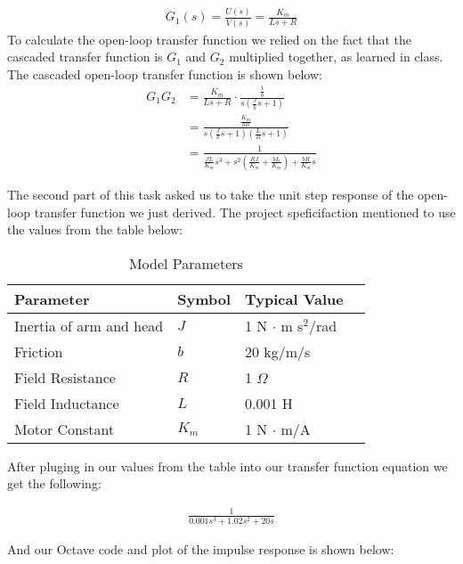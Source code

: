 \documentclass{article}
\begin{document}
	\begin{align*}
		G_1(s) = \frac{U(s)}{V(s)} = \frac{K_m}{Ls + R} 
	\end{align*}
	To calculate the open-loop transfer function we relied on the fact that
	the cascaded transfer function is $G_1$ and $G_2$ multiplied together, as
	learned in class. The cascaded open-loop transfer function is shown below:
	\begin{align*}
		G_1G_2 &= \frac{K_m}{Ls+R} \cdot \frac{\frac{1}{b}}{s(\frac{J}{b}s + 1)} \\
			   &= \frac{\frac{K_m}{bR}}{s\left(\frac{J}{b}s + 1\right)
			   \left(\frac{L}{R}s + 1\right)} \\
			   &= \frac{1}{\frac{JL}{K_m}s^3 + s^2\left( \frac{RJ}{K_m} + 
			   \frac{bL}{K_m} \right) + \frac{bR}{K_m}s}
	\end{align*}

	The second part of this task asked us to take the unit step response of the 
	open-loop transfer function we just derived. The project speficifaction 
	mentioned to use the values from the table below:\\

	\begin{table}[H]
	\begin{center}
    \begin{tabular}{ | l | l | l | p{5cm} |}
    \hline
    Parameter & Symbol & Typical Value \\ \hline
    Inertia of arm and head & $J$ & 1 N $\cdot$ m s$^2$/rad \\ \hline 
    Friction & $b$ & 20 kg/m/s \\ \hline
    Field Resistance & $R$ & 1 $\Omega$ \\ \hline
	Field Inductance & $L$ & 0.001 H \\ \hline
	Motor Constant & $K_m$ & 1 N $\cdot$ m/A \\
    \hline
    \end{tabular}
	\end{center}
	\caption{Model Parameters}
	\end{table}

	After pluging in our values from the table into our transfer function 
	equation we get the following:

	\begin{align*}
		\frac{1}{0.001s^3 + 1.02 s^2 + 20s} 
	\end{align*}

	And our Octave code and plot of the impulse response is shown below: \\
\end{document}
